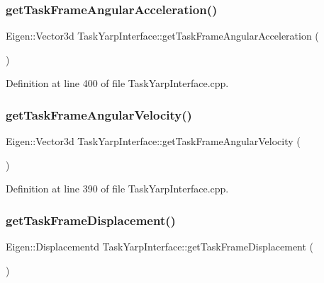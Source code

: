 \subsubsection{\texorpdfstring{get\+Task\+Frame\+Angular\+Acceleration()}{getTaskFrameAngularAcceleration()}}
{\footnotesize\ttfamily Eigen\+::\+Vector3d Task\+Yarp\+Interface\+::get\+Task\+Frame\+Angular\+Acceleration (\begin{DoxyParamCaption}{ }\end{DoxyParamCaption})}



Definition at line 400 of file Task\+Yarp\+Interface.\+cpp.

\hypertarget{classocra_1_1TaskYarpInterface_adc74f01320a4326756d855b1e24e395f}{}\label{classocra_1_1TaskYarpInterface_adc74f01320a4326756d855b1e24e395f} 
\subsubsection{\texorpdfstring{get\+Task\+Frame\+Angular\+Velocity()}{getTaskFrameAngularVelocity()}}
{\footnotesize\ttfamily Eigen\+::\+Vector3d Task\+Yarp\+Interface\+::get\+Task\+Frame\+Angular\+Velocity (\begin{DoxyParamCaption}{ }\end{DoxyParamCaption})}



Definition at line 390 of file Task\+Yarp\+Interface.\+cpp.

\hypertarget{classocra_1_1TaskYarpInterface_aedcb64b913403fa8d5ba41be208732d1}{}\label{classocra_1_1TaskYarpInterface_aedcb64b913403fa8d5ba41be208732d1} 
\subsubsection{\texorpdfstring{get\+Task\+Frame\+Displacement()}{getTaskFrameDisplacement()}}
{\footnotesize\ttfamily Eigen\+::\+Displacementd Task\+Yarp\+Interface\+::get\+Task\+Frame\+Displacement (\begin{DoxyParamCaption}{ }\end{DoxyParamCaption})}



